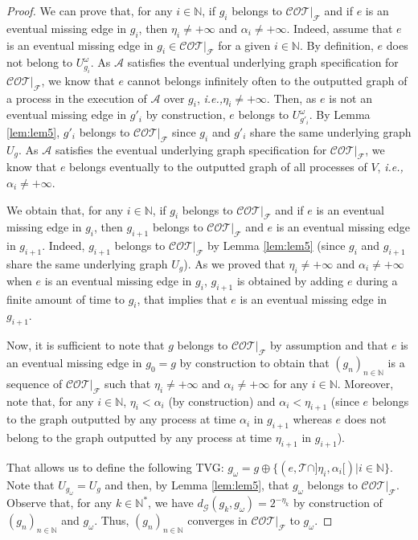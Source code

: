 \documentclass[11pt]{article}
\newcommand{\ie}{{\em i.e.,}\xspace}
\begin{document}
\begin{proof}
We can prove that, for any $i\in\mathbb{N}$, if $g_i$ belongs to $\mathcal{COT}|_\mathcal{F}$ and if $e$ is an eventual missing edge in $g_i$, then $\eta_i\neq+\infty$ and $\alpha_i\neq+\infty$. Indeed, assume that $e$ is an eventual missing edge in $g_i\in\mathcal{COT}|_\mathcal{F}$ for a given $i\in\mathbb{N}$. By definition, $e$ does not belong to $U^\omega_{g_i}$. As $\mathcal{A}$ satisfies the eventual underlying graph specification for $\mathcal{COT}|_\mathcal{F}$, we know that $e$ cannot belongs infinitely often to the outputted graph of a process in the execution of $\mathcal{A}$ over $g_i$, \ie $\eta_i\neq+\infty$. Then, as $e$ is not an eventual missing edge in $g'_i$ by construction, $e$ belongs to $U^\omega_{g'_i}$. By Lemma \ref{lem:lem5}, $g'_i$ belongs to $\mathcal{COT}|_\mathcal{F}$ since $g_i$ and $g'_i$ share the same underlying graph $U_g$. As $\mathcal{A}$ satisfies the eventual underlying graph specification for $\mathcal{COT}|_\mathcal{F}$, we know that $e$ belongs eventually to the outputted graph of all processes of $V$, \ie $\alpha_i\neq+\infty$.

We obtain that, for any $i\in\mathbb{N}$, if $g_i$ belongs to $\mathcal{COT}|_\mathcal{F}$ and if $e$ is an eventual missing edge in $g_i$, then $g_{i+1}$ belongs to $\mathcal{COT}|_\mathcal{F}$ and $e$ is an eventual missing edge in $g_{i+1}$. Indeed, $g_{i+1}$ belongs to $\mathcal{COT}|_\mathcal{F}$ by Lemma \ref{lem:lem5} (since $g_i$ and $g_{i+1}$ share the same underlying graph $U_g$). As we proved that $\eta_i\neq+\infty$ and $\alpha_i\neq+\infty$ when $e$ is an eventual missing edge in $g_i$, $g_{i+1}$ is obtained by adding $e$ during a finite amount of time to $g_i$, that implies that $e$ is an eventual missing edge in $g_{i+1}$.

Now, it is sufficient to note that $g$ belongs to $\mathcal{COT}|_\mathcal{F}$ by assumption and that $e$ is an eventual missing edge in $g_0=g$ by construction to obtain that $(g_n)_{n\in\mathbb{N}}$ is a sequence of $\mathcal{COT}|_\mathcal{F}$ such that $\eta_i\neq+\infty$ and $\alpha_i\neq+\infty$ for any $i\in\mathbb{N}$. Moreover, note that, for any $i\in\mathbb{N}$, $\eta_i<\alpha_i$ (by construction) and $\alpha_i<\eta_{i+1}$ (since $e$ belongs to the graph outputted by any process at time $\alpha_i$ in $g_{i+1}$ whereas $e$ does not belong to the graph outputted by any process at time $\eta_{i+1}$ in $g_{i+1}$). 

That allows us to define the following TVG: $g_\omega=g\oplus\{(e,\mathcal{T}\cap]\eta_i,\alpha_i[)|i\in\mathbb{N}\}$. Note that $U_{g_\omega}=U_g$ and then, by Lemma \ref{lem:lem5}, that $g_\omega$ belongs to $\mathcal{COT}|_\mathcal{F}$. Observe that, for any $k\in\mathbb{N}^*$, we have $d_\mathcal{G}(g_k,g_\omega)=2^{-\eta_k}$ by construction of $(g_n)_{n\in\mathbb{N}}$ and $g_\omega$. Thus, $(g_n)_{n\in\mathbb{N}}$ converges in $\mathcal{COT}|_\mathcal{F}$ to $g_\omega$.


\end{proof}
\end{document}
